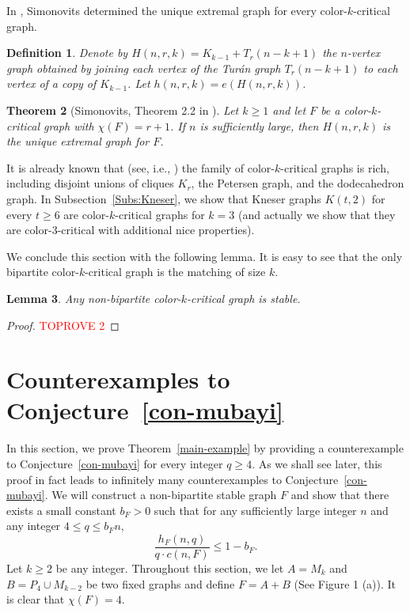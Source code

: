 \documentclass[10pt]{article}
\newtheorem{theorem}{Theorem}[section]
\newtheorem{definition}[theorem]{Definition}
\newtheorem{lemma}[theorem]{Lemma}
\begin{document}
In \cite{Simonovits1974}, Simonovits determined the unique extremal graph for every color-$k$-critical graph.

\begin{definition}
Denote by $H(n,r,k)=K_{k-1}+ T_r(n-k+1)$ the $n$-vertex graph obtained by joining each vertex of the Tur\'{a}n graph $T_r(n-k+1)$ to each vertex of a copy of $K_{k-1}$. Let $h(n,r,k)=e(H(n,r,k))$.
\end{definition}

\begin{theorem}[Simonovits, Theorem 2.2 in \cite{Simonovits1974}]\label{extremal graph for mk-critical graph}
Let $k\geq 1$ and let $F$ be a color-$k$-critical graph with $\chi(F)=r+1$.
If $n$ is sufficiently large, then $H(n,r,k)$ is the unique extremal graph for $F$.
\end{theorem}

It is already known that (see, i.e., \cite{Simonovits1974,Simonovits1999})
the family of color-$k$-critical graphs is rich, including disjoint unions of cliques $K_r$, the Petersen graph, and the dodecahedron graph.
In Subsection~\ref{Subs:Kneser}, we show that Kneser graphs $K(t,2)$ for every $t\geq 6$ are color-$k$-critical graphs for $k=3$ (and actually we show that they are color-$3$-critical with additional nice properties).

We conclude this section with the following lemma. 
It is easy to see that the only bipartite color-$k$-critical graph is the matching of size $k$.

\begin{lemma}\label{lem:color-k-critical-is-stable}
Any non-bipartite color-$k$-critical graph is stable.
\end{lemma}

\begin{proof}\textcolor{red}{TOPROVE 2}\end{proof}


\section{Counterexamples to Conjecture~\ref{con-mubayi}}\label{Sec:example}
In this section, we prove Theorem~\ref{main-example} by providing a counterexample to Conjecture~\ref{con-mubayi} for every integer $q\geq 4$.
As we shall see later, this proof in fact leads to infinitely many counterexamples to Conjecture~\ref{con-mubayi}.
We will construct a non-bipartite stable graph $F$ and show that there exists a small constant $b_F>0$ such that
for any sufficiently large integer $n$ and any integer $4\leq q\leq b_F n$, $$\frac{h_F(n,q)}{q\cdot c(n,F)}\leq 1-b_F.$$
Let $k\geq 2$ be any integer.
Throughout this section, we let $A=M_k$ and $B=P_4\cup M_{k-2}$ be two fixed graphs and define $F=A+B$ (See Figure 1 (a)).
It is clear that $\chi(F)=4$.
\end{document}
